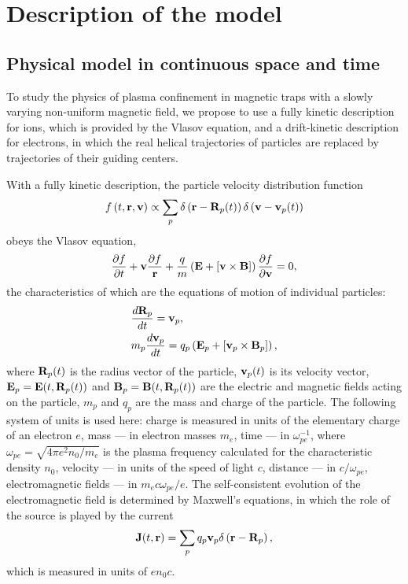 \documentclass[final,3p]{elsarticle}
\begin{document}
\section{Description of the model}\label{s2}
\subsection{Physical model in continuous space and time}  

To study the physics of plasma confinement in magnetic traps with a slowly varying non-uniform magnetic field, we propose to use a fully kinetic description for ions, which is provided by the Vlasov equation, and a drift-kinetic description for electrons, in which the real helical trajectories of particles are replaced by trajectories of their guiding centers.

With a fully kinetic description, the particle velocity distribution function 
\begin{equation}
	f\left(t,{\bf r},{\bf v}\right)\propto \sum\limits_p \delta\left({\bf r}-{\bf R}_p(t)\right) \delta\left({\bf v}-{\bf v}_p(t)\right)
\end{equation}
obeys the Vlasov equation,
\begin{equation}
	\frac{\partial f}{\partial t}+{\bf v}\frac{\partial f}{{\bf r}}+\frac{q}{m}\left({\bf E}+\left[{\bf v}\times {\bf B}\right]\right)\frac{\partial f}{\partial {\bf v}}=0,
\end{equation}
 the characteristics of which are the equations of motion of individual particles:
\begin{align}
& \frac{d {\bf R}_p}{dt}={\bf v}_p, \\
	&m_p \frac{d{\bf v}_p}{dt}=q_p \left({\bf E}_p+\left[{\bf v}_p\times {\bf B}_p\right]\right),
\end{align}
where ${\bf R}_p(t)$ is the radius vector of the particle, ${\bf v}_p(t)$ is its velocity vector, ${\bf E}_p={\bf E}(t, {\bf R}_p(t))$ and ${\bf B}_p={\bf B}(t, {\bf R}_p(t))$ are the electric and magnetic fields acting on the particle, $m_p$ and $q_p$ are the mass and charge of the particle. The following system of units is used here: charge is measured in units of the elementary charge of an electron $e$, mass --- in electron masses $m_e$, time --- in $\omega_{pe}^{-1}$, where $\omega_{pe}=\sqrt{4\pi e^2 n_0/m_e}$ is the plasma frequency calculated for the characteristic density $n_0$, velocity --- in units of the speed of light $c$, distance --- in $c/\omega_{pe}$, electromagnetic fields --- in $m_e c \omega_{pe}/e$. The self-consistent evolution of the electromagnetic field is determined by Maxwell's equations, in which the role of the source is played by the current
\begin{equation}
	{\bf J}(t,{\bf r})=\sum\limits_p q_p {\bf v}_p \delta\left({\bf r}-{\bf R}_p\right),
\end{equation}
which is measured in units of $en_0c$.
\end{document}
